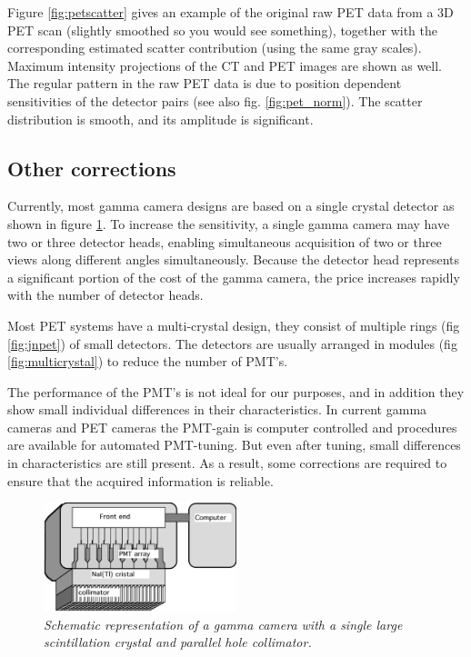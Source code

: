 \documentclass[11pt,oneside]{article}
\begin{document}
Figure \ref{fig:petscatter} gives an example of the original raw PET
data from a 3D PET scan (slightly smoothed so you would see
something), together with the corresponding estimated scatter
contribution (using the same gray scales). Maximum intensity
projections of the CT and PET images are shown as well. The regular
pattern in the raw PET data is due to position dependent sensitivities
of the detector pairs (see also fig. \ref{fig:pet_norm}). The scatter
distribution is smooth, and its amplitude is significant.


\subsection{Other corrections} \label{sec:corrections}
Currently, most gamma camera designs are based on a single crystal detector
as shown in figure \ref{fig:gammacamera}. To increase the sensitivity, a
single gamma camera may have two or three detector heads, enabling
simultaneous acquisition of two or three views along different angles
simultaneously. Because the detector head represents a significant portion of
the cost of the gamma camera, the price increases rapidly with the number of
detector heads.

Most PET systems have a multi-crystal design, they consist of multiple rings
(fig \ref{fig:jnpet}) of small detectors. The detectors are usually arranged
in modules (fig \ref{fig:multicrystal}) to reduce the number of PMT's.

The performance of the PMT's is not ideal for our purposes, and in addition
they show small individual differences in their characteristics. In current
gamma cameras and PET cameras the PMT-gain is computer controlled and
procedures are available for automated PMT-tuning. But even after tuning,
small differences in characteristics are still present.  As a result, some
corrections are required to ensure that the acquired information is reliable.

\begin{figure}[tb]
\centering
\includegraphics[width=0.5\textwidth]{figs/fig_jngamma.pdf}
\caption{\label{fig:gammacamera} \emph{Schematic representation of a gamma
camera with a single large scintillation crystal and parallel hole
collimator.}}
\end{figure}
\end{document}
